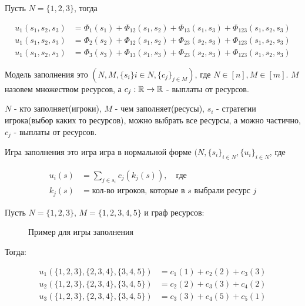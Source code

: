 \begin{exmpl}
	Пусть $N = \{1, 2, 3\}$, тогда 

	\begin{align*}
		u_1(s_1, s_2, s_3) &= \Phi_1(s_1) + \Phi_{12}(s_1, s_2) + \Phi_{13}(s_1, s_3) + \Phi_{123}(s_1, s_2, s_3) \\
		u_1(s_1, s_2, s_3) &= \Phi_2(s_2) + \Phi_{12}(s_1, s_2) + \Phi_{23}(s_2, s_3) + \Phi_{123}(s_1, s_2, s_3) \\
		u_1(s_1, s_2, s_3) &= \Phi_3(s_3) + \Phi_{13}(s_1, s_3) + \Phi_{23}(s_2, s_3) + \Phi_{123}(s_1, s_2, s_3)
	\end{align*}

\end{exmpl}

\begin{df}
	Модель заполнения это $(N, M, \{s_i\}{i \in N}, \{c_j\}_{j \in M})$, где  $N \in [n], M \in [m]$.
	$M$ назовем множеством ресурсов, а  $c_j: \mathbb{R} \to \mathbb{R}$ - выплаты от ресурсов.

	 $N$ - кто заполняет(игроки),  $M$ - чем заполняет(ресусы), $s_i$ - стратегии игрока(выбор каких то ресурсов), можно выбрать все ресурсы, а можно частично,  $c_j$ - выплаты от ресурсов. 
\end{df}

\begin{df}
	Игра заполнения это игра игра в нормальной форме $(N, \{s_i\}_{i \in N}, \{u_i\}_{i \in N}$, где 

	\begin{align*}
		u_i(s) &= \sum_{j \in s_i} c_j(k_j(s)), \quad \text{где} \\
		k_j(s) &= \text{кол-во игроков, которые в $s$ выбрали ресурс  $j$}
	\end{align*}

\end{df}

\begin{exmpl}
	Пусть $N = \{1, 2, 3\}, \, M = \{1, 2, 3, 4, 5\}$ и граф ресурсов:
\begin{figure}[ht]
    \centering
    \caption{Пример для игры заполнения}
    \label{fig:example-congestion-game}
\end{figure}

Тогда:

\begin{align*}
	u_1(\{1, 2, 3\}, \{2, 3, 4\}, \{3, 4, 5\}) &= c_1(1) + c_2(2) + c_3(3) \\
	u_2(\{1, 2, 3\}, \{2, 3, 4\}, \{3, 4, 5\}) &= c_2(2) + c_3(3) + c_4(2) \\
	u_3(\{1, 2, 3\}, \{2, 3, 4\}, \{3, 4, 5\}) &= c_3(3) + c_4(5) + c_5(1)
\end{align*}

\end{exmpl}

